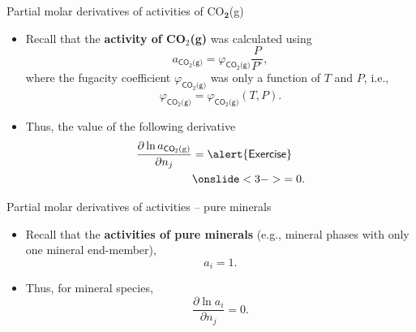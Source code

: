 \begin{frame}{Partial molar derivatives of activities of CO$_{\boldsymbol{2}}$(g)}

\vskip 10pt
\begin{itemize}
\item Recall that the {\bf activity of CO$_{2}$(g)} was calculated using
%
\[
a_{\mathsf{CO_{2}\text{(g)}}}=\varphi_{\mathsf{CO_{2}\text{(g)}}}\frac{P}{P^{\circ}},
\]
%
where the fugacity coefficient $\varphi_{\mathsf{CO_{2}\text{(g)}}}$
was only a function of $T$ and $P$, i.e., 
\[
\varphi_{\mathsf{CO_{2}\text{(g)}}}=\varphi_{\mathsf{CO_{2}\text{(g)}}}(T,P).
\]
\end{itemize}
\begin{itemize}
\hiddenpause
\item Thus, the value of the following derivative
%
\begin{alignat*}{2}
\frac{\partial\ln a_{\mathsf{CO_{2}\text{(g)}}}}{\partial n_{j}} & =\mathsf{\alert{Exercise}} \\
&\onslide<3->{ = 0.}
\end{alignat*}
\end{itemize}
\end{frame}
%
%
\begin{frame}{Partial molar derivatives of activities -- pure minerals}
\begin{itemize}
\item Recall that the {\bf activities of pure minerals} 
(e.g., mineral phases with only one mineral end-member),
\[
a_{i}=1.
\]
\item Thus, for mineral species, 
\[
\frac{\partial\ln a_{i}}{\partial n_{j}}=0.
\]
\end{itemize}
\end{frame}
%
%
